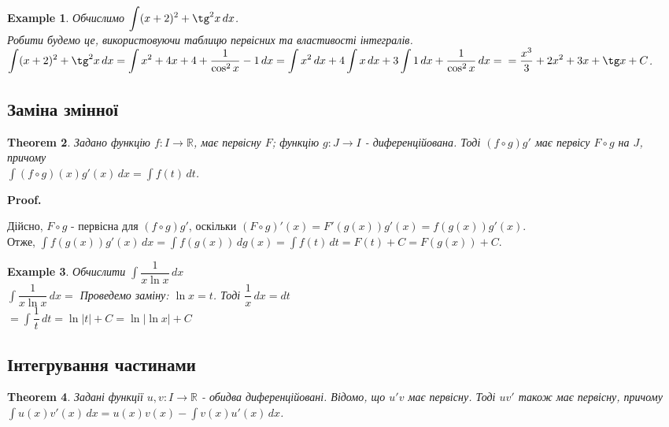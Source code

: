 \documentclass[a4paper, 10pt]{article}
\makeatletter
\def\huge{\displaystyle}
\def\qed{$\blacksquare$}
\theoremstyle{theoremdd}
\newtheorem{theorem}{Theorem}[subsection]
\theoremstyle{theoremdd}
\theoremstyle{theoremdd}
\theoremstyle{theoremdd}
\theoremstyle{theoremdd}
\newtheorem{example}[theorem]{Example}
\theoremstyle{theoremdd}
\theoremstyle{theoremdd}
\theoremstyle{theoremdd}
\theoremstyle{theoremdd}
\renewenvironment{proof}[1][Proof.\\]{\par
\pushQED{\hfill \qed}%
\normalfont \topsep6\p@\@plus6\p@\relax
\trivlist
\item\relax
{\bfseries
#1\@addpunct{.}}\hspace\labelsep\ignorespaces
}{%
\popQED\endtrivlist\@endpefalse
}
\makeatother
\begin{document}
\begin{example}
Обчислимо $\huge\int (x+2)^2 + \tg^2 x\,dx$.\\
Робити будемо це, використовуючи таблицю первісних та властивості інтегралів.\\
$\huge\int (x+2)^2 + \tg^2 x\,dx = \int x^2 + 4x + 4 + \dfrac{1}{\cos^2 x} - 1\,dx = \int x^2\,dx + 4 \int x\,dx + 3 \int 1\,dx + \dfrac{1}{\cos^2 x}\,dx = \\ = \dfrac{x^3}{3} + 2x^2 + 3x + \tg x + C$.
\end{example}

\subsection{Заміна змінної}
\begin{theorem} Задано функцію $f: I \to \mathbb{R}$, має первісну $F$; функцію $g: J \to I$ - диференційована. Тоді $(f \circ g) g'$ має первісу $F \circ g$ на $J$, причому \\
$\huge \int (f \circ g)(x) g'(x)\,dx = \int f(t)\,dt$.
\end{theorem}

\begin{proof}
Дійсно, $F \circ g$ - первісна для $(f \circ g) g'$, оскільки $(F \circ g)' (x) = F'(g(x)) g'(x) = f(g(x))g'(x)$. \\
Отже, $\huge \int f(g(x)) g'(x)\,dx = \int f(g(x)) \,dg(x) = \int f(t) \,dt = F(t) + C = F(g(x)) + C$.
\end{proof}

\begin{example} Обчислити $\huge \int \dfrac{1}{x \ln x} \,dx$\\
$\huge \int \dfrac{1}{x \ln x} \,dx \boxed{=} $ \hspace{2cm} Проведемо заміну: $\ln x = t$. Тоді $\dfrac{1}{x}\,dx = dt$\\
$\boxed{=} \huge \int \dfrac{1}{t}\,dt = \ln |t| + C = \ln |\ln x| + C$
\end{example}

\subsection{Інтегрування частинами}
\begin{theorem}
Задані функції $u,v: I \to \mathbb{R}$ - обидва диференційовані. Відомо, що $u'v$ має первісну. Тоді $uv'$ також має первісну, причому\\
$\huge\int u(x)v'(x)\,dx = u(x)v(x) - \int v(x)u'(x)\,dx$.
\end{theorem}
\end{document}
